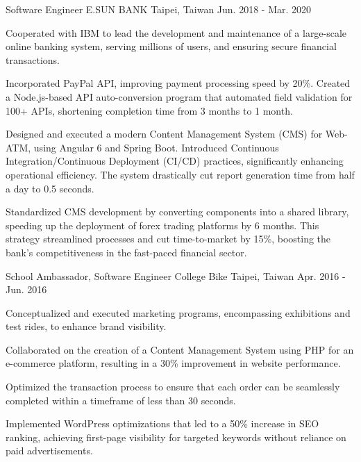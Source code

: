 \begin{cventries}
  \cventry
    {Software Engineer} %
    {E.SUN BANK} %
    {Taipei, Taiwan} %
    {Jun. 2018 - Mar. 2020} %
    {
      \begin{cvitems} %
        \item {Cooperated with IBM to lead the development and maintenance of a large-scale online banking system, serving millions of users, and ensuring secure financial transactions.}
        \item {Incorporated PayPal API, improving payment processing speed by 20\%. Created a Node.js-based API auto-conversion program that automated field validation for 100+ APIs, shortening completion time from 3 months to 1 month.}
        \item {Designed and executed a modern Content Management System (CMS) for Web-ATM, using Angular 6 and Spring Boot. Introduced Continuous Integration/Continuous Deployment (CI/CD) practices, significantly enhancing operational efficiency. The system drastically cut report generation time from half a day to 0.5 seconds.}
        \item {Standardized CMS development by converting components into a shared library, speeding up the deployment of forex trading platforms by 6 months. This strategy streamlined processes and cut time-to-market by 15\%, boosting the bank's competitiveness in the fast-paced financial sector.}
      \end{cvitems}
    }

  \cventry
    {School Ambassador, Software Engineer} %
    {College Bike} %
    {Taipei, Taiwan} %
    {Apr. 2016 - Jun. 2016} %
    {
      \begin{cvitems} %
        \item {Conceptualized and executed marketing programs, encompassing exhibitions and test rides, to enhance brand visibility.}
        \item {Collaborated on the creation of a Content Management System using PHP for an e-commerce platform, resulting in a 30\% improvement in website performance.}
        \item {Optimized the transaction process to ensure that each order can be seamlessly completed within a timeframe of less than 30 seconds.}
        \item {Implemented WordPress optimizations that led to a 50\% increase in SEO ranking, achieving first-page visibility for targeted keywords without reliance on paid advertisements.}
      \end{cvitems}
    }


\end{cventries}
